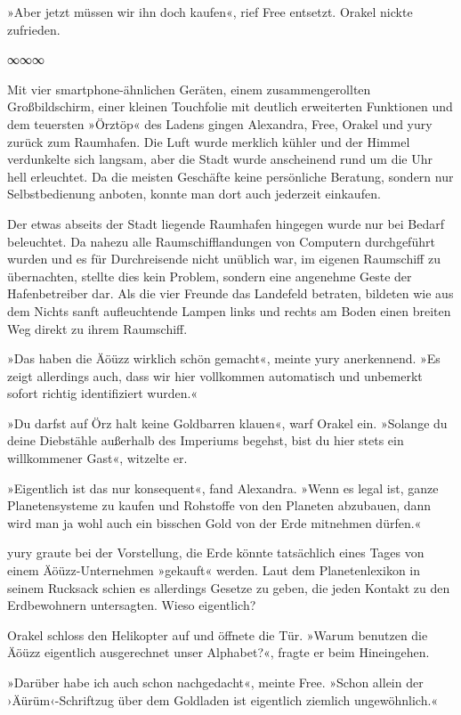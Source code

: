 »Aber jetzt müssen wir ihn doch kaufen«, rief Free entsetzt. Orakel nickte zufrieden.

\begin{center}
    ∞∞∞
\end{center}

Mit vier smartphone-ähnlichen Geräten, einem zusammengerollten Großbildschirm, einer kleinen Touchfolie mit deutlich erweiterten Funktionen und dem teuersten »Örztöp« des Ladens gingen Alexandra, Free, Orakel und yury zurück zum Raumhafen. Die Luft wurde merklich kühler und der Himmel verdunkelte sich langsam, aber die Stadt wurde anscheinend rund um die Uhr hell erleuchtet. Da die meisten Geschäfte keine persönliche Beratung, sondern nur Selbstbedienung anboten, konnte man dort auch jederzeit einkaufen.

Der etwas abseits der Stadt liegende Raumhafen hingegen wurde nur bei Bedarf beleuchtet. Da nahezu alle Raumschifflandungen von Computern durchgeführt wurden und es für Durchreisende nicht unüblich war, im eigenen Raumschiff zu übernachten, stellte dies kein Problem, sondern eine angenehme Geste der Hafenbetreiber dar. Als die vier Freunde das Landefeld betraten, bildeten wie aus dem Nichts sanft aufleuchtende Lampen links und rechts am Boden einen breiten Weg direkt zu ihrem Raumschiff.

»Das haben die Äöüzz wirklich schön gemacht«, meinte yury anerkennend. »Es zeigt allerdings auch, dass wir hier vollkommen automatisch und unbemerkt sofort richtig identifiziert wurden.«

»Du darfst auf Örz halt keine Goldbarren klauen«, warf Orakel ein. »Solange du deine Diebstähle außerhalb des Imperiums begehst, bist du hier stets ein willkommener Gast«, witzelte er.

»Eigentlich ist das nur konsequent«, fand Alexandra. »Wenn es legal ist, ganze Planetensysteme zu kaufen und Rohstoffe von den Planeten abzubauen, dann wird man ja wohl auch ein bisschen Gold von der Erde mitnehmen dürfen.«

yury graute bei der Vorstellung, die Erde könnte tatsächlich eines Tages von einem Äöüzz-Unternehmen »gekauft« werden. Laut dem Planetenlexikon in seinem Rucksack schien es allerdings Gesetze zu geben, die jeden Kontakt zu den Erdbewohnern untersagten. Wieso eigentlich?

Orakel schloss den Helikopter auf und öffnete die Tür. »Warum benutzen die Äöüzz eigentlich ausgerechnet unser Alphabet?«, fragte er beim Hineingehen.

»Darüber habe ich auch schon nachgedacht«, meinte Free. »Schon allein der ›Äürüm‹-Schriftzug über dem Goldladen ist eigentlich ziemlich ungewöhnlich.«

